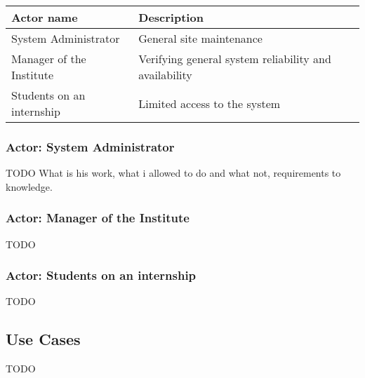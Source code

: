 \documentclass[12pt]{article}
\begin{document}
\begin{center}
	\begin{tabular}{| p{5.5cm} | p{9.5cm} |}
		\hline
		\textbf{Actor name}		& \textbf{Description}\\
		\hline
		System Administrator	& General site maintenance\\
		\hline
		Manager of the Institute	& Verifying general system reliability and availability\\
		\hline
		Students on an internship	& Limited access to the system\\
		\hline
	\end{tabular}
	\label{tab:Actors}
\end{center}

\subsubsection{Actor: System Administrator}
TODO What is his work, what i allowed to do and what not, requirements to knowledge.

\subsubsection{Actor: Manager of the Institute}
TODO

\subsubsection{Actor: Students on an internship}
TODO


\subsection{Use Cases}

TODO
\end{document}
